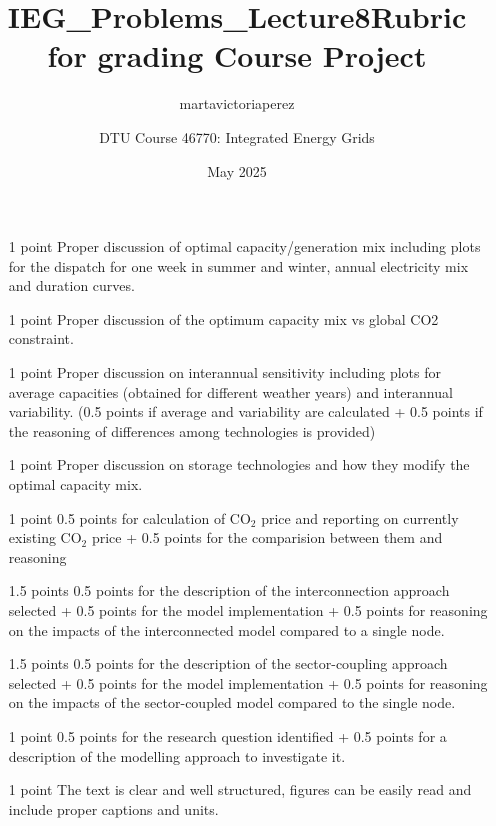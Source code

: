 \documentclass[10pt]{article}
\title{IEG_Problems_Lecture8}
\author{martavictoriaperez }
\date{May 2025}
\begin{document}
 
\title{\textbf{Rubric for grading Course Project}}
\author{
DTU Course 46770: Integrated Energy Grids }
\maketitle

\begin{itemize}

\item[1 point] Proper discussion of optimal capacity/generation mix including plots for the dispatch for one week in summer and winter, annual electricity mix and duration curves. 

\item[1 point] Proper discussion of the optimum capacity mix vs global CO2 constraint.

\item[1 point] Proper discussion on interannual sensitivity including plots for average capacities (obtained for different weather years) and interannual variability.
(0.5 points if average and variability are calculated + 0.5 points if the reasoning of differences among technologies is provided)

\item[1 point] Proper discussion on storage technologies and how they modify the optimal capacity mix.

\item[1 point] 0.5 points for calculation of CO$_2$ price and reporting on currently existing CO$_2$ price + 0.5 points for the comparision between them and reasoning

\item[1.5 points] 0.5 points for the description of the interconnection approach selected + 0.5 points for the model implementation + 0.5 points for reasoning on the impacts of the interconnected model compared to a single node. 

\item[1.5 points]  0.5 points for the description of the sector-coupling approach selected + 0.5 points for the model implementation + 0.5 points for reasoning on the impacts of the sector-coupled model compared to the single node.

\item[1 point] 0.5 points for the research question identified + 0.5 points for a description of the modelling approach to investigate it. 

\item[1 point]  The text is clear and well structured, figures can be easily read and include proper captions and units.
\end{itemize}
\end{document}
